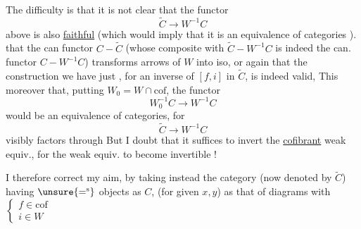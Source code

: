 The difficulty is that it is not clear that the functor
\[\widetilde C\longrightarrow W^{-1}C\]
above is also \uline{faithful} (which would imply that it is an equivalence of categories ).   that the can functor $C\mathbin{-}\widetilde C$ (whose composite with $\widetilde C\mathbin{-}W^{-1}C$ is indeed the can. functor $C\mathbin{-}W^{-1}C$) transforms arrows of $W$ into iso, or again that the construction we have just , for   an inverse of $[f,i]$ in $\widetilde C$, is indeed valid, 
This  moreover  that,  putting $W_0=W\cap\mathrm{cof}$, the functor
\[W_0^{-1}C\longrightarrow W^{-1}C\]
would be an equivalence of categories, for
\[\widetilde C\longrightarrow W^{-1}C\]
visibly factors through
But I doubt that it suffices to invert the \uline{cofibrant} weak equiv., for  the weak equiv. to become invertible !

I therefore correct my aim, by taking instead the category (now denoted by $\widetilde C$) having $\unsure{=^{\mathrm{s}}}$ objects as $C$,     (for given $x,y$) as that of diagrams
with $\left\{\begin{array}{l}f\in\mathrm{cof}\\i\in W\end{array}\right.$
